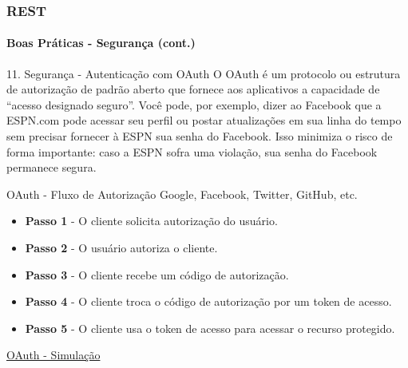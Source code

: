\documentclass[
	9pt, %
	t, %
]{beamer}
\newcommand{\iconLink}[2]{\href{#1}{\faLink \hspace{0.2em} {#2}}}
\begin{document}
\begin{frame}
	\frametitle{REST}
	\framesubtitle{Boas Práticas - Segurança (cont.)}

	\begin{block}{11. Segurança - Autenticação com OAuth}
		O OAuth é um protocolo ou estrutura de autorização de padrão aberto que fornece aos aplicativos a capacidade de “acesso designado seguro”. Você pode, por exemplo, dizer ao Facebook que a ESPN.com pode acessar seu perfil ou postar atualizações em sua linha do tempo sem precisar fornecer à ESPN sua senha do Facebook. Isso minimiza o risco de forma importante: caso a ESPN sofra uma violação, sua senha do Facebook permanece segura.
	\end{block}

	\begin{exampleblock}{OAuth - Fluxo de Autorização}
		Google, Facebook, Twitter, GitHub, etc.
		\begin{itemize}
			\item \textbf{Passo 1} - O cliente solicita autorização do usuário.
			\item \textbf{Passo 2} - O usuário autoriza o cliente.
			\item \textbf{Passo 3} - O cliente recebe um código de autorização.
			\item \textbf{Passo 4} - O cliente troca o código de autorização por um token de acesso.
			\item \textbf{Passo 5} - O cliente usa o token de acesso para acessar o recurso protegido.
		\end{itemize}
		\smallskip
		{\small \iconLink{https://blog.miguelgrinberg.com/static/images/flask-oauth2-demo.gif}{OAuth - Simulação}}
	\end{exampleblock}


\end{frame}
\end{document}
